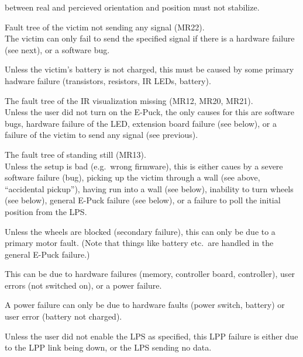 \documentclass[a4paper,parskip,headheight=38pt]{scrartcl} %
\begin{document}
\begin{description}
{    between real and percieved orientation and position} must not
    stabilize.
\item[\texttt{victim silent} \refpdf{victimsilent}:]
    Fault tree of the victim not sending any signal (MR22).
      \\
    The victim can only fail to send the specified signal if there is a
    hardware failure (see next), or a software bug.
\item[\texttt{victim hardware failure}]
    Unless the victim's battery is not charged, this must be caused by
    some primary hadware failure (transistors, resistors, IR LEDs,
    battery).
\item[\texttt{seenoled} \refpdf{seenoled}:]
    The fault tree of the IR visualization missing (MR12, MR20, MR21).
     \\
    Unless the user did not turn on the E-Puck, the only causes for
    this are software bugs, hardware failure of the LED, extension
    board failure (see below), or a failure of the victim to send any
    signal (see previous).
\item[\texttt{standing still} \refpdf{standingstill}:]
    The fault tree of standing still (MR13).
     \\
    Unless the setup is bad (e.g.\ wrong firmware), this is either
    caues by a severe software failure (bug), picking up the victim
    through a wall (see above, \enquote{accidental pickup}),
    having run into a wall (see below),
    inability to turn wheels (see below), general E-Puck failure (see
    below), or a failure to poll the initial position from the LPS.
\item[\texttt{wheels do not turn}:]
    Unless the wheels are blocked (secondary failure), this can only be
    due to a primary motor fault. (Note that things like battery etc.\
    are handled in the general E-Puck failure.)
\item[\texttt{E-Puck failure}:]
    This can be due to hardware failures (memory, controller board,
    controller), user errors (not switched on), or a power failure.
\item[\texttt{E-Puck power failure}:]
    A power failure can only be due to hardware faults (power switch,
    battery) or user error (battery not charged).
\item[\texttt{no initial position from LPS}:]
    Unless the user did not enable the LPS as specified, this LPP
    failure is either due to the LPP link being down, or the LPS
    sending no data.
\item[\texttt{LPP link down}:]

\end{description}
\end{document}
